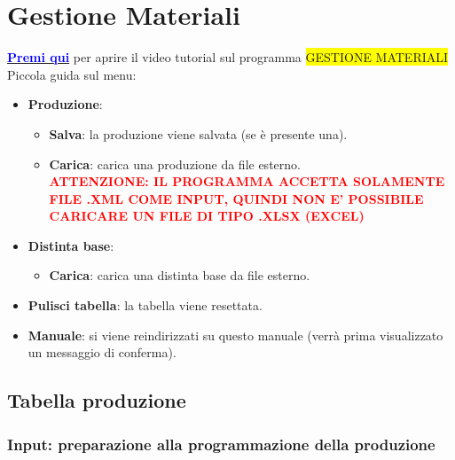 \documentclass[12pt,twoside]{report}
\newcommand{\coloredbold}[2]{\textcolor{#1}{\textbf{#2}}}
\begin{document}
\chapter{Gestione Materiali}

\href{https://drive.google.com/file/d/1kBvDtx1MlKc4LtRRRGeZtYbrp9oTocNf/view?usp=sharing}{\coloredbold{blue}{Premi qui}} per aprire il video tutorial sul programma \colorbox{yellow}{GESTIONE MATERIALI}\\

Piccola guida sul menu:
\begin{itemize}

	\item \textbf{Produzione}:
	
	\begin{itemize}
		\item \textbf{Salva}: la produzione viene salvata (se è presente una).
		\item \textbf{Carica}: carica una produzione da file esterno.\\
		\coloredbold{red}{ATTENZIONE: IL PROGRAMMA ACCETTA SOLAMENTE FILE .XML COME INPUT, QUINDI NON E' POSSIBILE CARICARE UN FILE DI TIPO .XLSX (EXCEL)}
	\end{itemize}

	\item \textbf{Distinta base}:
	
	\begin{itemize}
		\item \textbf{Carica}: carica una distinta base da file esterno.
	\end{itemize}

	\item \textbf{Pulisci tabella}: la tabella viene resettata.
	\item \textbf{Manuale}: si viene reindirizzati su questo manuale (verrà prima visualizzato un messaggio di conferma).

\end{itemize}


\section{Tabella produzione}

\subsection{Input: preparazione alla programmazione della produzione}
\end{document}
